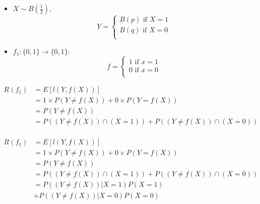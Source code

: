 \documentclass[usenames,dvipsnames]{beamer}
\begin{document}
\begin{frame}{}
    \begin{itemize}
        \item 
            $ X\sim B( \frac{1}{2} )$, 
         $$
            Y = \left\{
                \begin{array}{ll}
                    B(p) \text{ if } X=1   \\
                    B(q) \text{ if } X=0   \\
                \end{array}
                \right.
                $$
\item $f_1: \{0, 1\} \rightarrow \{0, 1\} $:
         $$
            f = \left\{
                \begin{array}{ll}
                    1 \text{ if } x=1   \\
                    0 \text{ if } x=0   \\
                \end{array}
                \right.
                $$
    \end{itemize}

    \begin{equation}
        \begin{aligned}
            \label{eq:}
            R(f_1)&= E[l(Y, f(X))] \\
            &= 1\times P(Y\neq f(X))+ 0\times P(Y=f(X))\\
            &= P(Y\neq f(X))\\
            &= P((Y\neq f(X))\cap (X=1))+P((Y\neq f(X))\cap (X=0))\\
        \end{aligned}
    \end{equation}
\end{frame}

\begin{frame}{}
    \begin{equation}
        \begin{aligned}
            \label{eq:}
            R(f_1)&= E[l(Y, f(X))] \\
            &= 1\times P(Y\neq f(X))+ 0\times P(Y=f(X))\\
            &= P(Y\neq f(X))\\
            &= P((Y\neq f(X))\cap (X=1))+P((Y\neq f(X))\cap (X=0))\\
            &= P((Y\neq f(X))| X=1)P(X=1)\\
            &+P((Y\neq f(X))| X=0)P(X=0)
        \end{aligned}
    \end{equation}
\end{frame}
\end{document}
